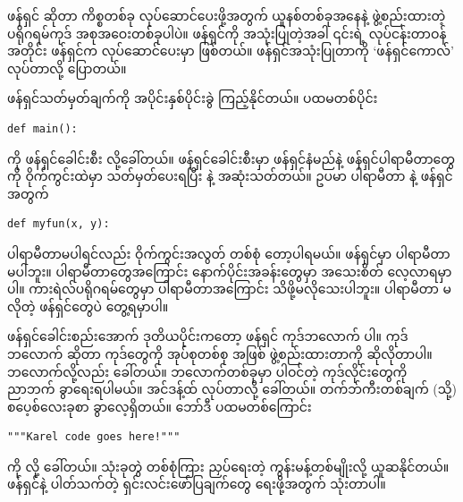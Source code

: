 \begin{mytcbox}
ဖန်ရှင်  ဆိုတာ ကိစ္စတစ်ခု လုပ်ဆောင်ပေးဖို့အတွက် ယူနစ်တစ်ခုအနေနဲ့ ဖွဲ့စည်းထားတဲ့ ပရိုဂရမ်ကုဒ် အစုအဝေးတစ်ခုပါပဲ။ ဖန်ရှင်ကို အသုံးပြုတဲ့အခါ ၎င်းရဲ့ လုပ်ငန်းတာဝန်အတိုင်း ဖန်ရှင်က လုပ်ဆောင်ပေးမှာ ဖြစ်တယ်။ ဖန်ရှင်အသုံးပြုတာကို ‘ဖန်ရှင်ကောလ်’   လုပ်တာလို့ ပြောတယ်။
\end{mytcbox}
%
 ဖန်ရှင်သတ်မှတ်ချက်ကို အပိုင်းနှစ်ပိုင်းခွဲ ကြည့်နိုင်တယ်။ ပထမတစ်ပိုင်း
%
\setlength{\fboxsep}{0pt}
\begin{verbatim}
def main():
\end{verbatim}
%
ကို ဖန်ရှင်ခေါင်းစီး  လို့ခေါ်တယ်။ ဖန်ရှင်ခေါင်းစီးမှာ ဖန်ရှင်နံမည်နဲ့ ဖန်ရှင်ပါရာမီတာတွေကို ဝိုက်ကွင်းထဲမှာ သတ်မှတ်ပေးရပြီး    နဲ့ အဆုံးသတ်တယ်။ ဥပမာ \fEn{,}  ပါရာမီတာ နဲ့   ဖန်ရှင် အတွက် 
%
\setlength{\fboxsep}{0pt}
\begin{verbatim}
def myfun(x, y):
\end{verbatim}
ပါရာမီတာမပါရင်လည်း ဝိုက်ကွင်းအလွတ် တစ်စုံ  တော့ပါရမယ်။  ဖန်ရှင်မှာ ပါရာမီတာ မပါဘူး။ ပါရာမီတာတွေအကြောင်း နောက်ပိုင်းအခန်းတွေမှာ အသေးစိတ် လေ့လာရမှာပါ။ ကားရဲလ်ပရိုဂရမ်တွေမှာ ပါရာမီတာအကြောင်း သိဖို့မလိုသေးပါဘူး။ ပါရာမီတာ မလိုတဲ့ ဖန်ရှင်တွေပဲ တွေ့ရမှာပါ။ 

ဖန်ရှင်ခေါင်းစည်းအောက် ဒုတိယပိုင်းကတော့  ဖန်ရှင် ကုဒ်ဘလောက်  ပါ။ ကုဒ်ဘလောက် ဆိုတာ ကုဒ်တွေကို အုပ်စုတစ်စု အဖြစ် ဖွဲ့စည်းထားတာကို ဆိုလိုတာပါ။ ဘလောက်လို့လည်း ခေါ်တယ်။ ဘလောက်တစ်ခုမှာ ပါဝင်တဲ့ ကုဒ်လိုင်းတွေကို ညာဘက် ခွာရေးရပါမယ်။ အင်ဒန့်ထ်  လုပ်တာလို့ ခေါ်တယ်။  တက်ဘ်ကီးတစ်ချက် (သို့) စပေ့စ်လေးခုစာ ခွာလေ့ရှိတယ်။  ဘော်ဒီ ပထမတစ်ကြောင်း
\setlength{\fboxsep}{0pt}
\begin{verbatim}
"""Karel code goes here!"""
\end{verbatim}
ကို  လို့ ခေါ်တယ်။  သုံးခုတွဲ  တစ်စုံကြား ညှပ်ရေးတဲ့ ကွန်းမန့်တစ်မျိုးလို့ ယူဆနိုင်တယ်။ ဖန်ရှင်နဲ့ ပါတ်သက်တဲ့ ရှင်းလင်းဖော်ပြချက်တွေ ရေးဖို့အတွက် သုံးတာပါ။

